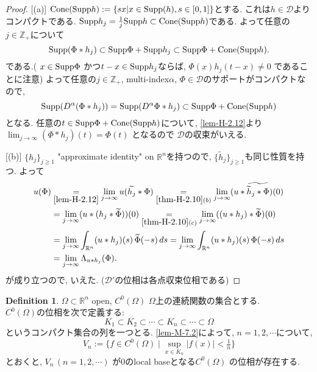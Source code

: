 \documentclass[dvipdfmx,a4paper,11pt]{article} %
\theoremstyle{definition}
\newtheorem{defn}[thm]{Definition}
\theoremstyle{remark}
\numberwithin{equation}{section}
\newcommand{\Supp}{{\rm Supp}}
\newcommand{\R}{\mathbb{R}}
\newcommand{\N}{\mathbb{Z}_+}
\begin{document}
\begin{proof}

[(a)]
$\mathrm{Cone}(\Supp h):=\{sx | x \in \mathrm{Supp}(h), s \in [0,1] \}$とする. これは$h \in \mathcal{D}$よりコンパクトである. 
$\Supp h_j  = \frac{1}{j}\Supp h \subset \mathrm{Cone}(\Supp h)$である.
よって任意の\( j \in \N\)について
 \[
 \Supp(\Phi \ast h_j) \subset \Supp \Phi + \Supp h_j \subset \Supp \Phi + \mathrm{Cone}(\Supp h).
 \]
 である.( \(x \in \Supp \Phi\) かつ\(t-x \in \Supp h_j\)ならば, \(\Phi(x)h_j(t-x) \neq 0\) であることに注意)
よって任意の\( j \in \N\), multi-index\( \alpha\), $\Phi \in \mathcal{D}$のサポートがコンパクトなので, 
\[
\Supp (D^\alpha (\Phi \ast  h_j)) 
= \Supp (D^\alpha \Phi * h_j) 
\subset \Supp \Phi + \mathrm{Cone}(\Supp h)
\]
となる. 
任意の$ t \in \Supp \Phi + \mathrm{Cone}(\Supp h)$について, \ref{lem-H-2.12}より
 \(\lim_{j \to \infty} (\Phi * h_j)(t) = \Phi(t)\) となるので
 $\mathcal{D}$の収束がいえる. 

[(b)]
\(\{h_j\}_{j \ge 1}\) "approximate identity" on \(\mathbb{R}^n\)を持つので, 
 \(\{\widetilde{h}_j\}_{j \ge 1}\)も同じ性質を持つ. 
 よって
\begin{align*}
u(\Phi) 
&\underset{\ref{lem-H-2.12}}{=} \lim_{j \to \infty} u(\widetilde{h_j} \ast \Phi) \underset{\ref{thm-H-2.10} (b)}{=} \lim_{j \to \infty} (u \ast \widetilde{\widetilde{h}_j  \ast \Phi})(0) \\
&= \lim_{j \to \infty} (u \ast (h_j \ast \widetilde{\Phi}))(0) 
\underset{\ref{thm-H-2.10} (c)}{=}\lim_{j \to \infty} ( (u \ast h_j) \ast \widetilde{\Phi})(0) \\
&= \lim_{j \to \infty} \int_{\R^n} (u \ast h_j)(s) \, \widetilde{\Phi}(-s) \, ds 
= \lim_{j \to \infty} \int_{\R^n} (u \ast h_j)(s) \, \Phi(-s) \, ds \\
&= \lim_{j \to \infty}  \Lambda_{u \ast h_j}(\Phi).
\end{align*}
が成り立つので, いえた. (\( \mathcal{D}'\)の位相は各点収束位相である)

\end{proof}


\begin{tcolorbox}[mybox]
\begin{defn}\cite[Definition 1.44]{Rud}
\label{defn-H-2.14}
\(\Omega \subset \R^n\) open,  
\(C^0(\Omega)\) \(\Omega\)上の連続関数の集合とする. \\

\(C^0(\Omega)\)の位相を次で定義する:
 \[K_1 \subset K_2 \subset \cdots \subset K_n \subset \cdots \subset \Omega\]
 というコンパクト集合の列を一つとる. 
 \ref{lem-M-7.2}によって,  \(n=1,2,\cdots\)について, 
\[
V_n := \{ f \in C^0(\Omega) \mid \sup_{x \in K_n} |f(x)| < \tfrac{1}{n} \}
\]
とおくと,  \(V_n \, (n=1,2,\cdots)\) が$0$のlocal baseとなる\(C^0(\Omega)\) の位相が存在する. 
\end{defn}
\end{tcolorbox}
\end{document}
